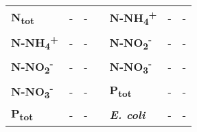 \begin{table}
\begin{center}
\begin{tabular}{l|c|c|llcc}
		\multicolumn{1}{|l|}{\textbf{N\textsubscript{tot}}}      & -                                                                        & -                                                                          & \multicolumn{1}{l|}{} & \multicolumn{1}{l|}{\textbf{N-NH\textsubscript{4}\textsuperscript{+}}}  & \multicolumn{1}{c|}{-}                                                                       & \multicolumn{1}{c|}{-}                                                                          \\ \cline{1-3} \cline{5-7} 
		\multicolumn{1}{|l|}{\textbf{N-NH\textsubscript{4}\textsuperscript{+}}}    & -                                                                        & -                                                                          & \multicolumn{1}{l|}{} & \multicolumn{1}{l|}{\textbf{N-NO\textsubscript{2}\textsuperscript{-}}}  & \multicolumn{1}{c|}{-}                                                                       & \multicolumn{1}{c|}{-}                                                                          \\ \cline{1-3} \cline{5-7} 
		\multicolumn{1}{|l|}{\textbf{N-NO\textsubscript{2}\textsuperscript{-}}}    & -                                                                        & -                                                                          & \multicolumn{1}{l|}{} & \multicolumn{1}{l|}{\textbf{N-NO\textsubscript{3}\textsuperscript{-}}}  & \multicolumn{1}{c|}{-}                                                                       & \multicolumn{1}{c|}{-}                                                                          \\ \cline{1-3} \cline{5-7} 
		\multicolumn{1}{|l|}{\textbf{N-NO\textsubscript{3}\textsuperscript{-}}}    & -                                                                        & -                                                                          & \multicolumn{1}{l|}{} & \multicolumn{1}{l|}{\textbf{P\textsubscript{tot}}}    & \multicolumn{1}{c|}{-}                                                                       & \multicolumn{1}{c|}{-}                                                                          \\ \cline{1-3} \cline{5-7} 
		\multicolumn{1}{|l|}{\textbf{P\textsubscript{tot}}}      & -                                                                        & -                                                                          & \multicolumn{1}{l|}{} & \multicolumn{1}{l|}{\textbf{\textit{E. coli}}} & \multicolumn{1}{c|}{-}                                                                       & \multicolumn{1}{c|}{-}                                                                          \\ \cline{1-3} \cline{5-7} 

\end{tabular}
\end{center}
\end{table}
